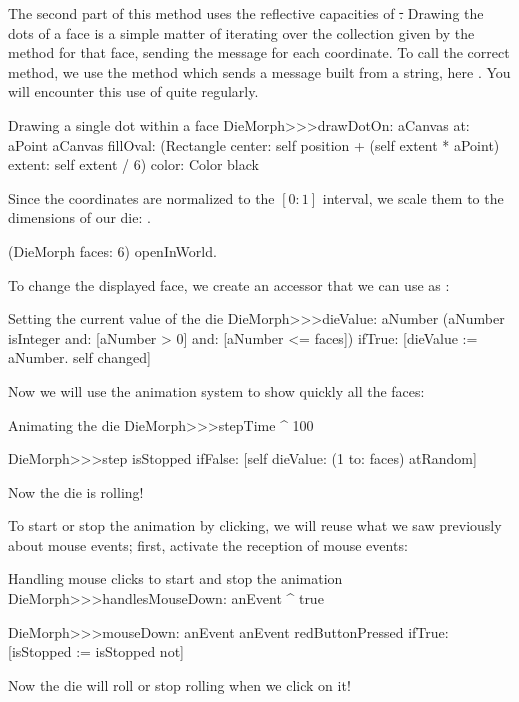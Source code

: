 \documentclass[a4paper,10pt,twoside]{book}
\begin{document}
The second part of this method uses the reflective capacities of \st.
Drawing the dots of a face is a simple matter of iterating over the collection given by the  method for that face, sending the  message for each coordinate. To call the correct  method, we use the  method which sends a message built from a string, here . You will encounter this use of  quite regularly.
\begin{method}{Drawing a single dot within a face}
DieMorph>>>drawDotOn: aCanvas at: aPoint
   aCanvas
      fillOval: (Rectangle
         center: self position + (self extent * aPoint)
         extent: self extent / 6)
      color: Color black
\end{method}

Since the coordinates are normalized to the $[0{:}1]$ interval, we scale them to the dimensions of our die: .

\begin{code}{}
(DieMorph faces: 6) openInWorld.
\end{code}

To change the displayed face, we create an accessor that we can use as :
\begin{method}{Setting the current value of the die}
DieMorph>>>dieValue: aNumber
   (aNumber isInteger
         and: [aNumber > 0]
         and: [aNumber <= faces])
      ifTrue:
         [dieValue := aNumber.
         self changed]
\end{method}

Now we will use the animation system to show quickly all the faces:
\begin{methods}{Animating the die}
DieMorph>>>stepTime
   ^ 100

DieMorph>>>step
   isStopped ifFalse: [self dieValue: (1 to: faces) atRandom]
\end{methods}
Now the die is rolling!

To start or stop the animation by clicking, we will reuse what we saw previously about mouse events; first, activate the reception of mouse events:
\begin{methods}{Handling mouse clicks to start and stop the animation}
DieMorph>>>handlesMouseDown: anEvent
   ^ true

DieMorph>>>mouseDown: anEvent
   anEvent redButtonPressed
      ifTrue: [isStopped := isStopped not]
\end{methods}
Now the die will roll or stop rolling when we click on it!
\end{document}

